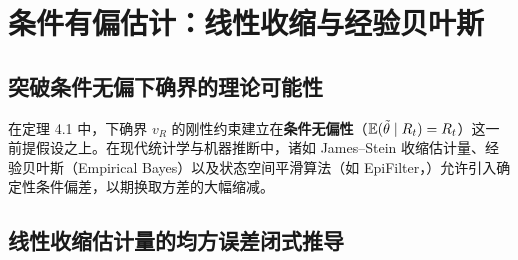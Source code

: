 \section{条件有偏估计：线性收缩与经验贝叶斯}
\label{sec:part13}

\subsection{突破条件无偏下确界的理论可能性}

在定理 4.1 中，下确界 $v_R$ 的刚性约束建立在\textbf{条件无偏性}（$\mathbb{E}(\tilde{\theta} \mid R_t) = R_t$）这一前提假设之上。在现代统计学与机器推断中，诸如 James--Stein 收缩估计量、经验贝叶斯（Empirical Bayes）以及状态空间平滑算法（如 EpiFilter，\citet{parag2021improved}）允许引入确定性条件偏差，以期换取方差的大幅缩减。

\subsection{线性收缩估计量的均方误差闭式推导}


